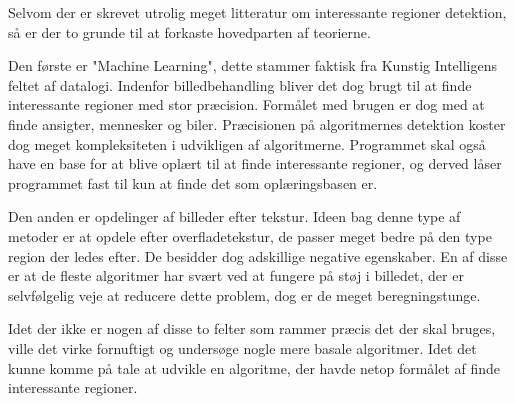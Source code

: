 {Selvom der er skrevet utrolig meget litteratur om interessante regioner
detektion, så er der to grunde til at forkaste hovedparten af teorierne.

Den første er "Machine Learning", dette stammer faktisk fra Kunstig
Intelligens feltet af datalogi. Indenfor billedbehandling bliver det dog
brugt til at finde interessante regioner med stor præcision. Formålet
med brugen er dog med at finde ansigter, mennesker og
biler\cite{ViolaJones01}\cite{SchneidermanKanade00}\cite{Gabor}. Præcisionen på
algoritmernes detektion koster dog meget kompleksiteten i udvikligen 
af algoritmerne. Programmet skal også have en base for at blive oplært
til at finde interessante regioner, og derved låser programmet fast til
kun at finde det som oplæringsbasen er.

Den anden er opdelinger af billeder efter tekstur. Ideen bag denne type
af metoder er at opdele efter
overfladetekstur\cite{218442}\cite{CarsonBelongie02}\cite{PapageorgiouPoggio}, de passer meget bedre på
den type region der ledes efter. De besidder dog adskillige
negative egenskaber. En af disse er at de fleste algoritmer har svært
ved at fungere på støj i billedet, der er selvfølgelig veje at reducere
dette problem, dog er de meget beregningstunge.\cite{PalPal}

Idet der ikke er nogen af disse to felter som rammer præcis det der skal
bruges, ville det virke fornuftigt og undersøge nogle mere basale
algoritmer. Idet det kunne komme på tale at udvikle en algoritme, der
havde netop formålet af finde interessante regioner.


}
